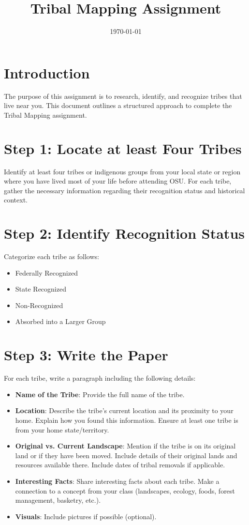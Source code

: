\documentclass{article}
\title{Tribal Mapping Assignment}
\author{}
\date{\today}
\begin{document}
\maketitle

\section{Introduction}
The purpose of this assignment is to research, identify, and recognize tribes that live near you. This document outlines a structured approach to complete the Tribal Mapping assignment.

\section{Step 1: Locate at least Four Tribes}
Identify at least four tribes or indigenous groups from your local state or region where you have lived most of your life before attending OSU. For each tribe, gather the necessary information regarding their recognition status and historical context.

\section{Step 2: Identify Recognition Status}
Categorize each tribe as follows:
\begin{itemize}
    \item Federally Recognized
    \item State Recognized
    \item Non-Recognized
    \item Absorbed into a Larger Group
\end{itemize}

\section{Step 3: Write the Paper}
For each tribe, write a paragraph including the following details:
\begin{itemize}
    \item \textbf{Name of the Tribe}: Provide the full name of the tribe.
    \item \textbf{Location}: Describe the tribe's current location and its proximity to your home. Explain how you found this information. Ensure at least one tribe is from your home state/territory.
    \item \textbf{Original vs. Current Landscape}: Mention if the tribe is on its original land or if they have been moved. Include details of their original lands and resources available there. Include dates of tribal removals if applicable.
    \item \textbf{Interesting Facts}: Share interesting facts about each tribe. Make a connection to a concept from your class (landscapes, ecology, foods, forest management, basketry, etc.).
    \item \textbf{Visuals}: Include pictures if possible (optional).
\end{itemize}
\end{document}
